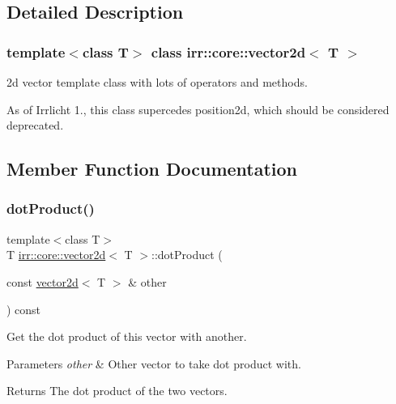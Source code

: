 \subsection{Detailed Description}
\subsubsection*{template$<$class T$>$\newline
class irr\+::core\+::vector2d$<$ T $>$}

2d vector template class with lots of operators and methods. 

As of Irrlicht 1., this class supercedes position2d, which should be considered deprecated. 

\subsection{Member Function Documentation}
\mbox{\label{classirr_1_1core_1_1vector2d_acf2fea122833c456c6dd66811acc8b91}} 
\subsubsection{\texorpdfstring{dot\+Product()}{dotProduct()}}
{\footnotesize\ttfamily template$<$class T$>$ \\
T \hyperlink{classirr_1_1core_1_1vector2d}{irr\+::core\+::vector2d}$<$ T $>$\+::dot\+Product (\begin{DoxyParamCaption}\item[{const \hyperlink{classirr_1_1core_1_1vector2d}{vector2d}$<$ T $>$ \&}]{other }\end{DoxyParamCaption}) const\hspace{0.3cm}{\ttfamily [inline]}}



Get the dot product of this vector with another. 


\begin{DoxyParams}{Parameters}
{\em other} & Other vector to take dot product with. \\
\hline
\end{DoxyParams}
\begin{DoxyReturn}{Returns}
The dot product of the two vectors. 
\end{DoxyReturn}
\mbox{\label{classirr_1_1core_1_1vector2d_a9b04601d982c880ed599b5bb16cd86a7}} 
